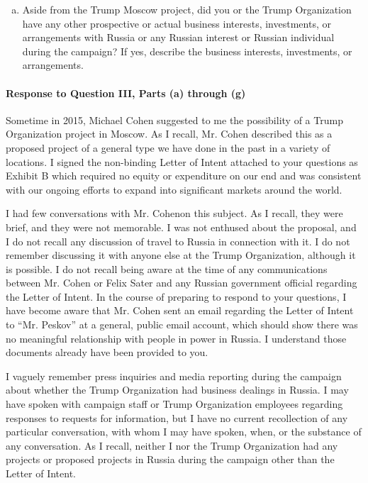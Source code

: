 \begin{enumerate}[a.]
\item Aside from the Trump Moscow project, did you or the Trump Organization have any other prospective or actual business interests, investments, or arrangements with Russia or any Russian interest or Russian individual during the campaign?
If yes, describe the business interests, investments, or arrangements.

\end{enumerate}

\paragraph*{Response to Question III, Parts (a) through (g)}

Sometime in 2015, Michael Cohen suggested to me the possibility of a Trump Organization project in Moscow.
As I recall, Mr. Cohen described this as a proposed project of a general type we have done in the past in a variety of locations.
I signed the non-binding Letter of Intent attached to your questions as Exhibit B which required no equity or expenditure on our end and was consistent with our ongoing efforts to expand into significant markets around the world.

I had few conversations with Mr. Cohenon this subject.
As I recall, they were brief, and they were not memorable.
I was not enthused about the proposal, and I do not recall any discussion of travel to Russia in connection with it.
I do not remember discussing it with anyone else at the Trump Organization, although it is possible.
I do not recall being aware at the time of any communications between Mr. Cohen or Felix Sater and any Russian government official regarding the Letter of Intent.
In the course of preparing to respond to your questions, I have become aware that Mr. Cohen sent an email regarding the Letter of Intent to “Mr. Peskov” at a general, public email account, which should show there was no meaningful relationship with people in power in Russia.
I understand those documents already have been provided to you.

I vaguely remember press inquiries and media reporting during the campaign about whether the Trump Organization had business dealings in Russia.
I may have spoken with campaign staff or Trump Organization employees regarding responses to requests for information, but I have no current recollection of any particular conversation, with whom I may have spoken, when, or the substance of any conversation.
As I recall, neither I nor the Trump Organization had any projects or proposed projects in Russia during the campaign other than the Letter of Intent.

